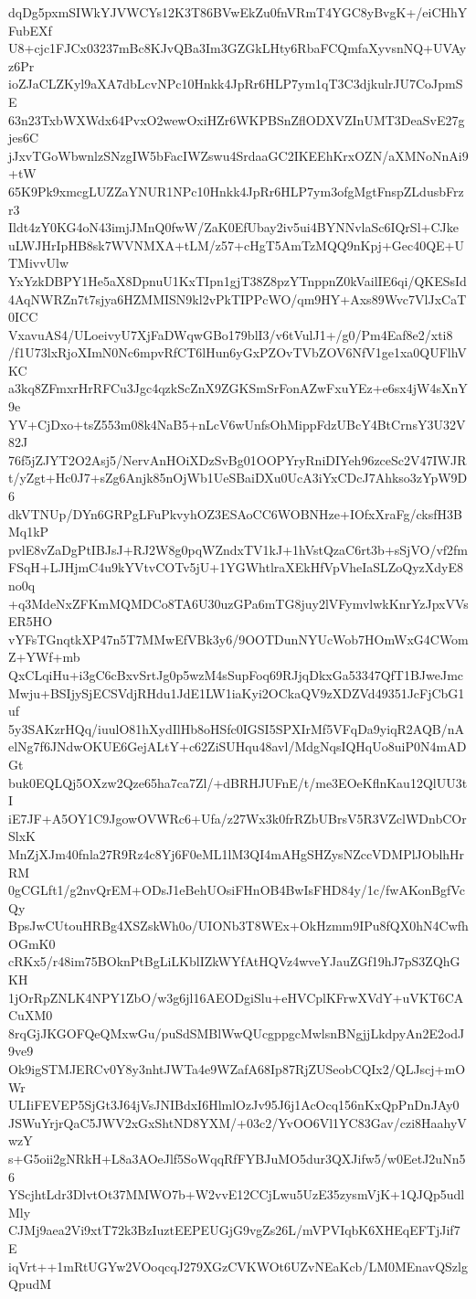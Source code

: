 dqDg5pxmSIWkYJVWCYs12K3T86BVwEkZu0fnVRmT4YGC8yBvgK+/eiCHhYFubEXf
U8+cjc1FJCx03237mBc8KJvQBa3Im3GZGkLHty6RbaFCQmfaXyvsnNQ+UVAyz6Pr
ioZJaCLZKyl9aXA7dbLcvNPc10Hnkk4JpRr6HLP7ym1qT3C3djkulrJU7CoJpmSE
63n23TxbWXWdx64PvxO2wewOxiHZr6WKPBSnZflODXVZInUMT3DeaSvE27gjes6C
jJxvTGoWbwnlzSNzgIW5bFacIWZswu4SrdaaGC2IKEEhKrxOZN/aXMNoNnAi9+tW
65K9Pk9xmcgLUZZaYNUR1NPc10Hnkk4JpRr6HLP7ym3ofgMgtFnspZLdusbFrzr3
Ildt4zY0KG4oN43imjJMnQ0fwW/ZaK0EfUbay2iv5ui4BYNNvlaSc6IQrSl+CJke
uLWJHrIpHB8sk7WVNMXA+tLM/z57+cHgT5AmTzMQQ9nKpj+Gec40QE+UTMivvUlw
YxYzkDBPY1He5aX8DpnuU1KxTIpn1gjT38Z8pzYTnppnZ0kVailIE6qi/QKESsId
4AqNWRZn7t7sjya6HZMMISN9kl2vPkTIPPcWO/qm9HY+Axs89Wvc7VlJxCaT0ICC
VxavuAS4/ULoeivyU7XjFaDWqwGBo179blI3/v6tVulJ1+/g0/Pm4Eaf8e2/xti8
/f1U73lxRjoXImN0Nc6mpvRfCT6lHun6yGxPZOvTVbZOV6NfV1ge1xa0QUFlhVKC
a3kq8ZFmxrHrRFCu3Jgc4qzkScZnX9ZGKSmSrFonAZwFxuYEz+e6sx4jW4sXnY9e
YV+CjDxo+tsZ553m08k4NaB5+nLcV6wUnfsOhMippFdzUBcY4BtCrnsY3U32V82J
76f5jZJYT2O2Asj5/NervAnHOiXDzSvBg01OOPYryRniDIYeh96zceSc2V47IWJR
t/yZgt+Hc0J7+sZg6Anjk85nOjWb1UeSBaiDXu0UcA3iYxCDcJ7Ahkso3zYpW9D6
dkVTNUp/DYn6GRPgLFuPkvyhOZ3ESAoCC6WOBNHze+IOfxXraFg/cksfH3BMq1kP
pvlE8vZaDgPtIBJsJ+RJ2W8g0pqWZndxTV1kJ+1hVstQzaC6rt3b+sSjVO/vf2fm
FSqH+LJHjmC4u9kYVtvCOTv5jU+1YGWhtlraXEkHfVpVheIaSLZoQyzXdyE8no0q
+q3MdeNxZFKmMQMDCo8TA6U30uzGPa6mTG8juy2lVFymvlwkKnrYzJpxVVsER5HO
vYFsTGnqtkXP47n5T7MMwEfVBk3y6/9OOTDunNYUcWob7HOmWxG4CWomZ+YWf+mb
QxCLqiHu+i3gC6cBxvSrtJg0p5wzM4sSupFoq69RJjqDkxGa53347QfT1BJweJmc
Mwju+BSIjySjECSVdjRHdu1JdE1LW1iaKyi2OCkaQV9zXDZVd49351JcFjCbG1uf
5y3SAKzrHQq/iuulO81hXydIlHb8oHSfc0IGSI5SPXIrMf5VFqDa9yiqR2AQB/nA
elNg7f6JNdwOKUE6GejALtY+c62ZiSUHqu48avl/MdgNqsIQHqUo8uiP0N4mADGt
buk0EQLQj5OXzw2Qze65ha7ca7Zl/+dBRHJUFnE/t/me3EOeKflnKau12QlUU3tI
iE7JF+A5OY1C9JgowOVWRc6+Ufa/z27Wx3k0frRZbUBrsV5R3VZclWDnbCOrSlxK
MnZjXJm40fnla27R9Rz4c8Yj6F0eML1lM3QI4mAHgSHZysNZccVDMPlJOblhHrRM
0gCGLft1/g2nvQrEM+ODsJ1eBehUOsiFHnOB4BwIsFHD84y/1c/fwAKonBgfVcQy
BpsJwCUtouHRBg4XSZskWh0o/UIONb3T8WEx+OkHzmm9IPu8fQX0hN4CwfhOGmK0
cRKx5/r48im75BOknPtBgLiLKblIZkWYfAtHQVz4wveYJauZGf19hJ7pS3ZQhGKH
1jOrRpZNLK4NPY1ZbO/w3g6jl16AEODgiSlu+eHVCplKFrwXVdY+uVKT6CACuXM0
8rqGjJKGOFQeQMxwGu/puSdSMBlWwQUcgppgcMwlsnBNgjjLkdpyAn2E2odJ9ve9
Ok9igSTMJERCv0Y8y3nhtJWTa4e9WZafA68Ip87RjZUSeobCQIx2/QLJscj+mOWr
ULIiFEVEP5SjGt3J64jVsJNIBdxI6HlmlOzJv95J6j1AcOcq156nKxQpPnDnJAy0
JSWuYrjrQaC5JWV2xGxShtND8YXM/+03c2/YvOO6Vl1YC83Gav/czi8HaahyVwzY
s+G5oii2gNRkH+L8a3AOeJlf5SoWqqRfFYBJuMO5dur3QXJifw5/w0EetJ2uNn56
YScjhtLdr3DlvtOt37MMWO7b+W2vvE12CCjLwu5UzE35zysmVjK+1QJQp5udlMly
CJMj9aea2Vi9xtT72k3BzIuztEEPEUGjG9vgZs26L/mVPVIqbK6XHEqEFTjJif7E
iqVrt++1mRtUGYw2VOoqcqJ279XGzCVKWOt6UZvNEaKcb/LM0MEnavQSzlgQpudM
